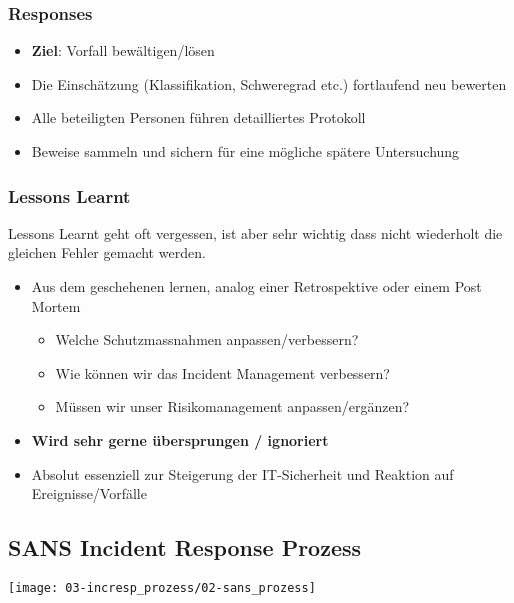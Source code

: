 \subsubsection{Responses}
\begin{itemize}
    \item \textbf{Ziel}: Vorfall bewältigen/lösen
    \item Die Einschätzung (Klassifikation, Schweregrad etc.) fortlaufend neu bewerten
    \item Alle beteiligten Personen führen detailliertes Protokoll
    \item Beweise sammeln und sichern für eine mögliche spätere Untersuchung
\end{itemize}

\subsubsection{Lessons Learnt}
\label{incresp:prozess:iso:ll}
Lessons Learnt geht oft vergessen, ist aber sehr wichtig dass nicht wiederholt die gleichen Fehler gemacht werden.

\begin{itemize}
    \item Aus dem geschehenen lernen, analog einer Retrospektive oder einem Post Mortem
    \begin{itemize}
        \item Welche Schutzmassnahmen anpassen/verbessern?
        \item Wie können wir das Incident Management verbessern?
        \item Müssen wir unser Risikomanagement anpassen/ergänzen?
    \end{itemize}
    \item \textbf{Wird sehr gerne übersprungen / ignoriert}
    \item Absolut essenziell zur Steigerung der IT-Sicherheit und Reaktion auf Ereignisse/Vorfälle
\end{itemize}

\newpage

\subsection{SANS Incident Response Prozess}
\begin{center}
    \vspace{-8pt}
    \texttt{[image: 03-incresp\_prozess/02-sans\_prozess]}
    \vspace{-8pt}
\end{center}

